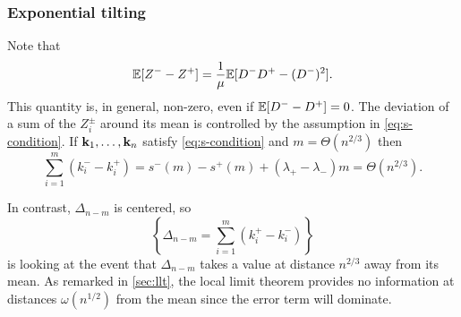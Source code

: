 \subsubsection{Exponential tilting}

Note that
\begin{equation*}
    {\mathbb E}[Z^- - Z^+] = \frac{1}{\mu} {\mathbb E}[D^-D^+ - (D^-)^2].
\end{equation*}
This quantity is, in general, non-zero, even if ${\mathbb E}[D^- - D^+] = 0$. The deviation of a sum of the $Z^{\pm}_i$ around its mean is controlled by the assumption in \cref{eq:s-condition}. If ${\mathbf k}_1, \ldots, {\mathbf k}_n$ satisfy \cref{eq:s-condition} and $m = \Theta(n^{2/3})$ then
\begin{equation*}
    \sum_{i=1}^m (k_i^- - k_i^+) = s^-(m) - s^+(m) + (\lambda_+ - \lambda_-) m = \Theta(n^{2/3}).
\end{equation*}

In contrast, $\Delta_{n-m}$ is centered, so
\begin{equation*}
    \left\{ \Delta_{n-m} = \textstyle \sum_{i=1}^m (k_i^+ - k_i^-) \right\}  
\end{equation*}
is looking at the event that $\Delta_{n-m}$ takes a value at distance $n^{2/3}$ away from its mean. As remarked in \cref{sec:llt}, the local limit theorem provides no information at distances $\omega(n^{1/2})$ from the mean since the error term will dominate.

